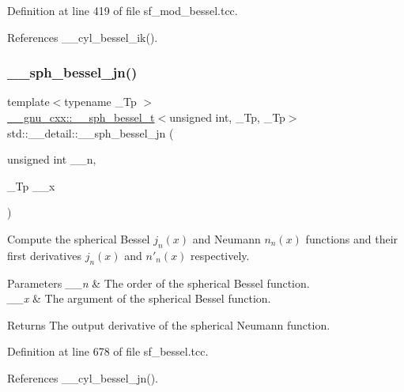 Definition at line 419 of file sf\+\_\+mod\+\_\+bessel.\+tcc.



References \+\_\+\+\_\+cyl\+\_\+bessel\+\_\+ik().

\mbox{\label{namespacestd_1_1____detail_afd4f4f072924a9396676c437135c27f9}} 
\subsubsection{\texorpdfstring{\+\_\+\+\_\+sph\+\_\+bessel\+\_\+jn()}{\_\_sph\_bessel\_jn()}}
{\footnotesize\ttfamily template$<$typename \+\_\+\+Tp $>$ \\
\hyperlink{struct____gnu__cxx_1_1____sph__bessel__t}{\+\_\+\+\_\+gnu\+\_\+cxx\+::\+\_\+\+\_\+sph\+\_\+bessel\+\_\+t}$<$unsigned int, \+\_\+\+Tp, \+\_\+\+Tp$>$ std\+::\+\_\+\+\_\+detail\+::\+\_\+\+\_\+sph\+\_\+bessel\+\_\+jn (\begin{DoxyParamCaption}\item[{unsigned int}]{\+\_\+\+\_\+n,  }\item[{\+\_\+\+Tp}]{\+\_\+\+\_\+x }\end{DoxyParamCaption})}



Compute the spherical Bessel $ j_n(x) $ and Neumann $ n_n(x) $ functions and their first derivatives $ j_n(x) $ and $ n'_n(x) $ respectively. 


\begin{DoxyParams}{Parameters}
{\em \+\_\+\+\_\+n} & The order of the spherical Bessel function. \\
\hline
{\em \+\_\+\+\_\+x} & The argument of the spherical Bessel function. \\
\hline
\end{DoxyParams}
\begin{DoxyReturn}{Returns}
The output derivative of the spherical Neumann function. 
\end{DoxyReturn}


Definition at line 678 of file sf\+\_\+bessel.\+tcc.



References \+\_\+\+\_\+cyl\+\_\+bessel\+\_\+jn().



